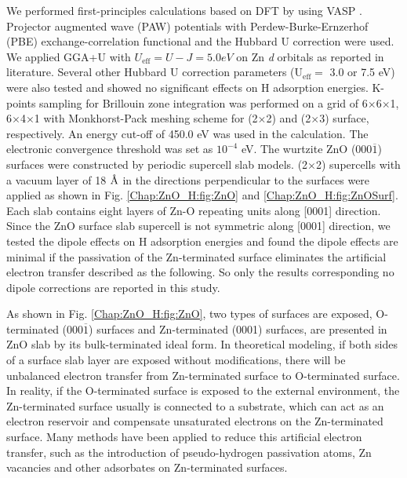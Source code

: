 We performed first-principles calculations based on \ac{DFT} by using \ac{VASP} \cite{kresse1996efficient,kresse1999ultrasoft}. Projector augmented wave (PAW) \cite{blochl1994projector} potentials with Perdew-Burke-Ernzerhof (PBE) \cite{perdew1996generalized} exchange-correlation functional and the Hubbard U correction \cite{dudarev1998electron} were used. We applied GGA+U with $U_\text{eff}=U - J = 5.0 eV$ on Zn \textit{d} orbitals as reported in literature\cite{huang2012detailed, oba2010native}. Several other Hubbard U correction parameters ($\text{U}_\text{eff} =$ 3.0 or 7.5 eV) were also tested and showed no significant effects on H adsorption energies. K-points sampling for Brillouin zone integration was performed on a grid of 6$\times$6$\times$1, 6$\times$4$\times$1 with Monkhorst-Pack meshing scheme for (2$\times$2) and (2$\times$3) surface, respectively\cite{monkhorst1976special}. An energy cut-off of 450.0 eV was used in the calculation. The electronic convergence threshold was set as $10^{-4}$ eV. The wurtzite ZnO (000$\overline{1}$) surfaces were constructed by periodic supercell slab models. (2$\times$2) supercells with a vacuum layer of 18 $\mbox{\normalfont\AA}$ in the directions perpendicular to the surfaces were applied as shown in Fig. \ref{Chap:ZnO_H:fig:ZnO} and \ref{Chap:ZnO_H:fig:ZnOSurf}. Each slab contains eight layers of Zn-O repeating units along [0001] direction. Since the ZnO surface slab supercell is not symmetric along [0001] direction, we tested the dipole effects on H adsorption energies and found the dipole effects are minimal if the passivation of the Zn-terminated surface eliminates the artificial electron transfer described as the following. So only the results corresponding no dipole corrections are reported in this study.

As shown in Fig. \ref{Chap:ZnO_H:fig:ZnO}, two types of surfaces are exposed, O-terminated (000$\overline{1}$) surfaces and Zn-terminated  (0001) surfaces, are presented in ZnO slab by its bulk-terminated ideal form. In theoretical modeling, if both sides of a surface slab layer are exposed without modifications, there will be unbalanced electron transfer from Zn-terminated surface to O-terminated surface\cite{Meyer03}. In reality, if the O-terminated surface is exposed to the external environment, the Zn-terminated surface usually is connected to a substrate, which can act as an electron reservoir and compensate unsaturated electrons on the Zn-terminated surface. Many methods have been applied to reduce this artificial electron transfer, such as the introduction of pseudo-hydrogen passivation atoms, Zn vacancies and other adsorbates on Zn-terminated surfaces\cite{calzolari2013dipolar,lin2007microscopic,lahmer2015effect}.

